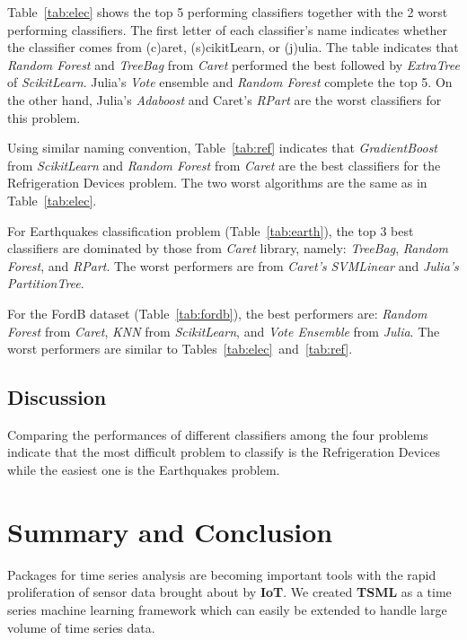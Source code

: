 \documentclass{juliacon}
\begin{document}
Table~\ref{tab:elec} shows the top 5 performing classifiers together with the 2 worst performing classifiers. The first letter of each classifier's name indicates whether the classifier comes from (c)aret, (s)cikitLearn, or (j)ulia. The table indicates that \emph{Random Forest} and \emph{TreeBag} from \emph{Caret} performed the best followed by \emph{ExtraTree} of \emph{ScikitLearn}. Julia's \emph{Vote} ensemble and \emph{Random Forest} complete the top 5. On the other hand, Julia's \emph{Adaboost} and Caret's \emph{RPart} are the worst classifiers for this problem.  

\vskip 6pt

Using similar naming convention, Table~\ref{tab:ref} indicates that \emph{GradientBoost} from \emph{ScikitLearn} and \emph{Random Forest} from \emph{Caret} are the best classifiers for the Refrigeration Devices problem. The two worst algorithms are the same as in Table~\ref{tab:elec}.

\vskip 6pt

For Earthquakes classification problem (Table~\ref{tab:earth}), the top 3 best classifiers are dominated by those from \emph{Caret} library, namely: \emph{TreeBag}, \emph{Random Forest}, and \emph{RPart}. The worst performers are from \emph{Caret's} \emph{SVMLinear} and \emph{Julia's} \emph{PartitionTree}.

\vskip 6pt

For the FordB dataset (Table~\ref{tab:fordb}), the best performers are: \emph{Random Forest} from \emph{Caret}, \emph{KNN} from \emph{ScikitLearn}, and \emph{Vote Ensemble} from \emph{Julia}. The worst performers are similar to Tables~\ref{tab:elec}~and~\ref{tab:ref}.

\subsection{Discussion}
Comparing the performances of different classifiers among the four problems indicate that the most difficult problem to classify is the Refrigeration Devices while the easiest one is the Earthquakes problem. 

\section{Summary and Conclusion}
Packages for time series analysis are becoming important tools with the rapid proliferation of sensor data brought about by \textbf{IoT}.  We created \textbf{TSML} as a time series machine learning framework which can easily be extended to handle large volume of time series data. 
\end{document}
